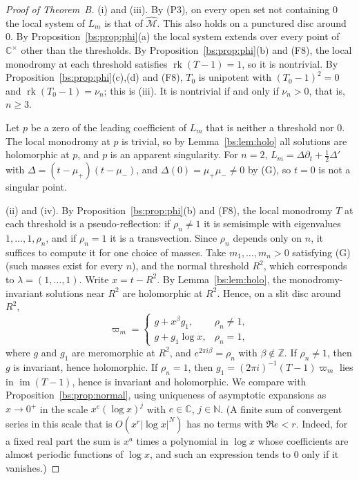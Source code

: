 \documentclass[11pt,a4paper]{article}
\theoremstyle{definition}
\theoremstyle{remark}
\numberwithin{equation}{section}
\newcommand{\C}{\mathbb{C}}
\newcommand{\Z}{\mathbb{Z}}
\newcommand{\N}{\mathbb{N}}
\newcommand{\cM}{\mathcal{M}}
\DeclareMathOperator{\rk}{rk}
\DeclareMathOperator{\im}{im}
\newcommand{\Mhat}{\widehat{\cM}}
\begin{document}
\begin{proof}[Proof of Theorem~B]
(i) and (iii). By (P3), on every open set not containing $0$ the local system of $L_m$ is that of $\Mhat$. This also holds on a punctured disc around $0$. By Proposition~\ref{bs:prop:phi}(a) the local system extends over every point of $\C^\times$ other than the thresholds. By Proposition~\ref{bs:prop:phi}(b) and (F8), the local monodromy at each threshold satisfies $\rk(T-1)=1$, so it is nontrivial. By Proposition~\ref{bs:prop:phi}(c),(d) and (F8), $T_0$ is unipotent with $(T_0-1)^2=0$ and $\rk(T_0-1)=\nu_n$; this is (iii). It is nontrivial if and only if $\nu_n>0$, that is, $n\ge3$.

Let $p$ be a zero of the leading coefficient of $L_m$ that is neither a threshold nor $0$. The local monodromy at $p$ is trivial, so by Lemma~\ref{bs:lem:holo} all solutions are holomorphic at $p$, and $p$ is an apparent singularity. For $n=2$, $L_m=\Delta\partial_t+\frac12\Delta'$ with $\Delta=(t-\mu_+)(t-\mu_-)$, and $\Delta(0)=\mu_+\mu_-\ne0$ by (G), so $t=0$ is not a singular point.

(ii) and (iv). By Proposition~\ref{bs:prop:phi}(b) and (F8), the local monodromy $T$ at each threshold is a pseudo-reflection: if $\rho_n\ne1$ it is semisimple with eigenvalues $1,\dots,1,\rho_n$, and if $\rho_n=1$ it is a transvection. Since $\rho_n$ depends only on $n$, it suffices to compute it for one choice of masses. Take $m_1,\dots,m_n>0$ satisfying (G) (such masses exist for every $n$), and the normal threshold $R^2$, which corresponds to $\lambda=(1,\dots,1)$. Write $x=t-R^2$. By Lemma~\ref{bs:lem:holo}, the monodromy-invariant solutions near $R^2$ are holomorphic at $R^2$. Hence, on a slit disc around $R^2$,
\[
\varpi_m=\begin{cases}g+x^\beta g_1,& \rho_n\ne1,\\ g+g_1\log x,&\rho_n=1,\end{cases}
\]
where $g$ and $g_1$ are meromorphic at $R^2$, and $e^{2\pi i\beta}=\rho_n$ with $\beta\notin\Z$. If $\rho_n\ne1$, then $g$ is invariant, hence holomorphic. If $\rho_n=1$, then $g_1=(2\pi i)^{-1}(T-1)\varpi_m$ lies in $\im(T-1)$, hence is invariant and holomorphic. We compare with Proposition~\ref{bs:prop:normal}, using uniqueness of asymptotic expansions as $x\to0^+$ in the scale $x^e(\log x)^j$ with $e\in\C$, $j\in\N$. (A finite sum of convergent series in this scale that is $O(x^r|\log x|^N)$ has no terms with $\Re e<r$. Indeed, for a fixed real part the sum is $x^a$ times a polynomial in $\log x$ whose coefficients are almost periodic functions of $\log x$, and such an expression tends to $0$ only if it vanishes.)


\end{proof}
\end{document}
